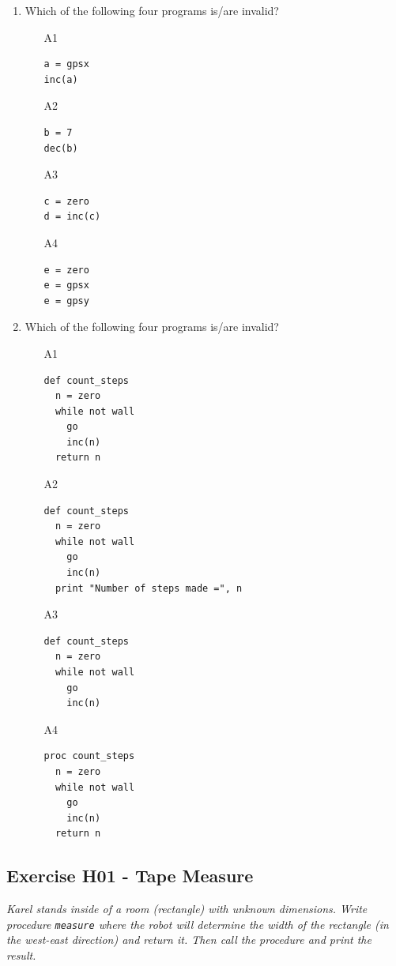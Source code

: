 \documentclass[article,A4,12pt]{llncs}
\begin{document}
{{{{\begin{enumerate}
\item Which of the following four programs is/are invalid?
\begin{enumerate}
\item[A1] 
\begin{verbatim}
a = gpsx
inc(a)
\end{verbatim}
\item[A2] 
\begin{verbatim}
b = 7
dec(b)
\end{verbatim}
\item[A3] 
\begin{verbatim}
c = zero
d = inc(c)
\end{verbatim}
\item[A4] 
\begin{verbatim}
e = zero
e = gpsx
e = gpsy
\end{verbatim}
\end{enumerate}
\item Which of the following four programs is/are invalid?
\begin{enumerate}
\item[A1] 
\begin{verbatim}
def count_steps
  n = zero
  while not wall
    go
    inc(n)
  return n
\end{verbatim}
\item[A2] 
\begin{verbatim}
def count_steps
  n = zero
  while not wall
    go
    inc(n)
  print "Number of steps made =", n
\end{verbatim}
\item[A3] 
\begin{verbatim}
def count_steps
  n = zero
  while not wall
    go
    inc(n)
\end{verbatim}
\item[A4] 
\begin{verbatim}
proc count_steps
  n = zero
  while not wall
    go
    inc(n)
  return n
\end{verbatim}
\end{enumerate}
\end{enumerate}

\subsection{Exercise H01 - Tape Measure}

{\em Karel stands inside of a room (rectangle) with unknown dimensions. Write procedure {\tt measure}  
where the robot will determine the width of the rectangle (in the west-east direction) and return it. 
Then call the procedure and print the result.}

}}}}
\end{document}
